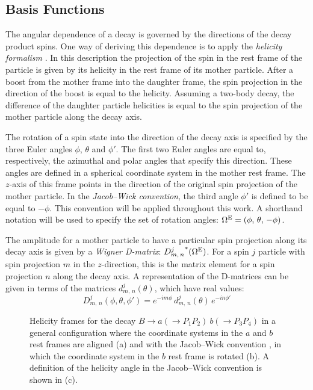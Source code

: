 \subsection{Basis Functions} \label{sec:angBasisFuncs}
The angular dependence of a decay is governed by the directions of the decay product spins. One way
of deriving this dependence is to apply the \emph{helicity formalism}
\cite{JacobWick,Chung,Richman,Kutschke}. In this
description the projection of the spin in the rest frame of the particle is given by its helicity
in the rest frame of its mother particle. After a boost from the mother frame into the daughter
frame, the spin projection in the direction of the boost is equal to the helicity. Assuming a
two-body decay, the difference of the daughter particle helicities is equal to the spin projection
of the mother particle along the decay axis.

The rotation of a spin state into the direction of the decay axis is specified by the three Euler
angles $\phi$, $\theta$ and $\phi'$. The first two Euler angles are equal to, respectively, the
azimuthal and polar angles that specify this direction. These angles are defined in a spherical
coordinate system in the mother rest frame. The $z$-axis of this frame points in the direction of
the original spin projection of the mother particle. In the \emph{Jacob--Wick convention}, the
third angle $\phi'$ is defined to be equal to $-\phi$. This convention will be applied throughout
this work. A shorthand notation will be used to specify the set of rotation angles:
$\Omega^\text{E}_\text{}=(\phi,\,\theta,\,-\phi)$.

The amplitude for a mother particle to have a particular spin projection along its decay axis is
given by a \emph{Wigner D-matrix}: ${D_{m,\,n}^{j}}^*(\Omega^\text{E}_\text{})$. For a spin $j$ particle with spin
projection $m$ in the $z$-direction, this is the matrix element for a spin projection $n$ along the
decay axis. A representation of the D-matrices can be given in terms of the matrices
$d_{m,\,n}^{j}(\theta)$, which have real values:
\begin{equation}
  D_{m,\,n}^{j}(\phi,\theta,\phi') = e^{-im\phi}\, d_{m,\,n}^{j}(\theta)\, e^{-in\phi'}
\end{equation}

\begin{figure}[htb]
  \centering
  \resizebox{0.9\textwidth}{!}{}
  \caption{Helicity frames for the decay $B\to a(\to P_1P_2)\ b(\to P_3P_4)$ in a general
    configuration where the coordinate systems in the $a$ and $b$ rest frames are aligned (a) and
    with the Jacob--Wick convention \cite{JacobWick}, in which the coordinate system in the $b$
    rest frame is rotated (b). A definition of the helicity angle \phihel{} in the Jacob--Wick
    convention is shown in (c).}
  \label{fig:helFormFrames}
\end{figure}


